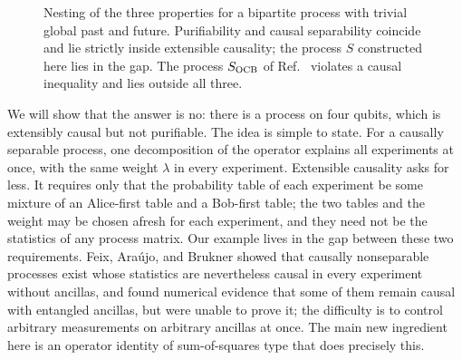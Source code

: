 \documentclass[aps,prl,reprint,superscriptaddress,nofootinbib,longbibliography,raggedbottom]{revtex4-2}
\begin{document}
\begin{figure}[t]
\centering
{}
\caption{Nesting of the three properties for a bipartite process with
trivial global past and future. Purifiability and causal separability
coincide and lie strictly inside extensible causality; the process $S$
constructed here lies in the gap. The process $S_{\rm OCB}$ of
Ref.~\cite{OCB} violates a causal inequality and lies outside all three.}
\label{fig:nesting}
\end{figure}

We will show that the answer is no: there is a process on four qubits, which is extensibly causal but not purifiable. The
idea is simple to state. For a causally separable process, one
decomposition of the operator explains all experiments at once, with the
same weight $\lambda$ in every experiment. Extensible causality asks for
less. It
requires only that the probability table of each experiment be some
mixture of an
Alice-first table and a Bob-first table; the two tables and the weight may
be chosen afresh for each experiment, and they need not be the statistics
of any process matrix. Our example lives in the gap between these two
requirements. Feix, Ara\'ujo, and Brukner \cite{FAB} showed that causally
nonseparable processes exist whose statistics are nevertheless causal in
every experiment without ancillas, and found numerical evidence that some
of them remain causal with entangled ancillas, but were unable to prove it;
the difficulty is to control arbitrary measurements on arbitrary ancillas
at once. The main new ingredient here is an
operator identity of sum-of-squares type that does precisely this.
\end{document}
